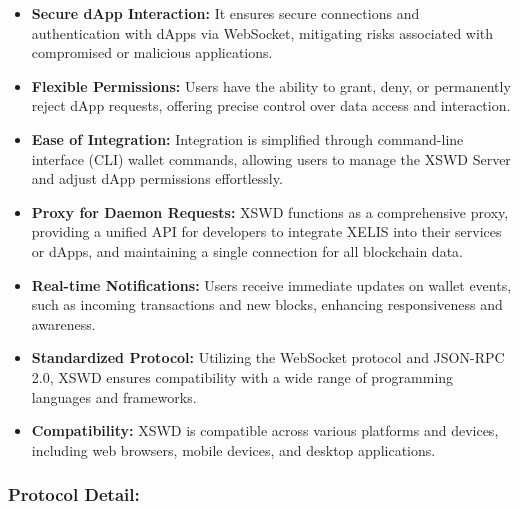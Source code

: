 \documentclass[12pt,a4paper,twocolumn]{article}
\begin{document}
\begin{itemize}

\item \textbf{Secure dApp Interaction:} It ensures secure connections and authentication with dApps via WebSocket, mitigating risks associated with compromised or malicious applications.\\

\item \textbf{Flexible Permissions:} Users have the ability to grant, deny, or permanently reject dApp requests, offering precise control over data access and interaction.\\

\item \textbf{Ease of Integration:} Integration is simplified through command-line interface (CLI) wallet commands, allowing users to manage the XSWD Server and adjust dApp permissions effortlessly.\\

\item \textbf{Proxy for Daemon Requests:} XSWD functions as a comprehensive proxy, providing a unified API for developers to integrate XELIS into their services or dApps, and maintaining a single connection for all blockchain data.\\

\item \textbf{Real-time Notifications:} Users receive immediate updates on wallet events, such as incoming transactions and new blocks, enhancing responsiveness and awareness.\\

\item \textbf{Standardized Protocol:} Utilizing the WebSocket protocol and JSON-RPC 2.0, XSWD ensures compatibility with a wide range of programming languages and frameworks.\\

\item \textbf{Compatibility:} XSWD is compatible across various platforms and devices, including web browsers, mobile devices, and desktop applications.\\
\end{itemize}
\subsubsection{Protocol Detail:}
\end{document}
